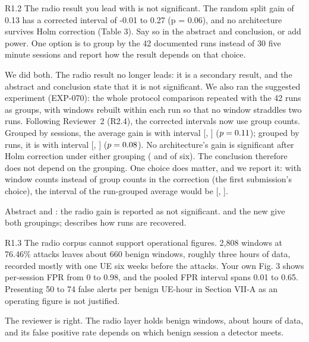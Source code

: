 \label{rv:R1.2}
\begin{concern}{R1.2}
The radio result you lead with is not significant. The random split gain of 0.13 has a corrected interval of -0.01 to 0.27 (p = 0.06), and no architecture survives Holm correction (Table 3). Say so in the abstract and conclusion, or add power. One option is to group by the 42 documented runs instead of 30 five minute sessions and report how the result depends on that choice.
\end{concern}
\response We did both. The radio result no longer leads: it is a secondary result, and the abstract and conclusion state that it is not significant. We also ran the suggested experiment (EXP-070): the whole protocol comparison repeated with the 42 runs as groups, with windows rebuilt within each run so that no window straddles two runs. Following Reviewer~2 (R2.4), the corrected intervals now use group counts. Grouped by sessions, the average gain is \RRadSessAvg{} with interval [\RRadSessLo, \RRadSessHi] ($p = 0.11$); grouped by runs, it is \RRadRunAvg{} with interval [\RRadRunLo, \RRadRunHi] ($p = 0.08$). No architecture's gain is significant after Holm correction under either grouping (\RRadSessSigN{} and \RRadRunSigN{} of six). The conclusion therefore does not depend on the grouping. One choice does matter, and we report it: with window counts instead of group counts in the correction (the first submission's choice), the interval of the run-grouped average would be [\RRadRunLoWin, \RRadRunHiWin].

\action Abstract and : the radio gain is reported as not significant.  and the new  give both groupings;  describes how runs are recovered.

\label{rv:R1.3}
\begin{concern}{R1.3}
The radio corpus cannot support operational figures. 2,808 windows at 76.46\% attacks leaves about 660 benign windows, roughly three hours of data, recorded mostly with one UE six weeks before the attacks. Your own Fig. 3 shows per-session FPR from 0 to 0.98, and the pooled FPR interval spans 0.01 to 0.65. Presenting 50 to 74 false alerts per benign UE-hour in Section VII-A as an operating figure is not justified.
\end{concern}
\response The reviewer is right. The radio layer holds \RRadBenignWin{} benign windows, about \RRadBenignHours{} hours of data, and its false positive rate depends on which benign session a detector meets.

